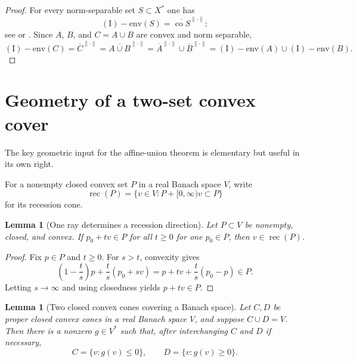 \documentclass[11pt]{article}
\newtheorem{lemma}[theorem]{Lemma}
\theoremstyle{remark}
\newcommand{\Ienv}{\operatorname{(I)\!\!-env}}
\newcommand{\co}{\operatorname{co}}
\newcommand{\rec}{\operatorname{rec}}
\begin{document}
\begin{proof}
For every norm-separable set $S\subset X^*$ one has
\[
 \Ienv(S)=\overline{\co S}^{\|\cdot\|};
\]
see \cite[Remark~1.1(ii)]{Kalenda2007} or
\cite[Proposition~4.4(b)]{KR}.  Since $A$, $B$, and $C=A\cup B$ are convex
and norm separable,
\[
 \Ienv(C)=\overline C^{\|\cdot\|}
 =\overline{A\cup B}^{\|\cdot\|}
 =\overline A^{\|\cdot\|}\cup\overline B^{\|\cdot\|}
 =\Ienv(A)\cup\Ienv(B).
\]
\end{proof}

\section{Geometry of a two-set convex cover}

The key geometric input for the affine-union theorem is elementary but
useful in its own right.

For a nonempty closed convex set $P$ in a real Banach space $V$, write
\[
 \rec(P)=\{v\in V: P+[0,\infty)v\subset P\}
\]
for its recession cone.

\begin{lemma}[One ray determines a recession direction]
\label{lem:ray}
Let $P\subset V$ be nonempty, closed, and convex.  If $p_0+tv\in P$ for all
$t\geq0$ for one $p_0\in P$, then $v\in\rec(P)$.
\end{lemma}

\begin{proof}
Fix $p\in P$ and $t\geq0$.  For $s>t$, convexity gives
\[
 \left(1-\frac ts\right)p+\frac ts(p_0+sv)
 =p+tv+\frac ts(p_0-p)\in P.
\]
Letting $s\to\infty$ and using closedness yields $p+tv\in P$.
\end{proof}

\begin{lemma}[Two closed convex cones covering a Banach space]
\label{lem:cones}
Let $C,D$ be proper closed convex cones in a real Banach space $V$, and
suppose $C\cup D=V$.  Then there is a nonzero $g\in V^*$ such that, after
interchanging $C$ and $D$ if necessary,
\[
 C=\{v:g(v)\leq0\},\qquad D=\{v:g(v)\geq0\}.
\]
\end{lemma}
\end{document}
